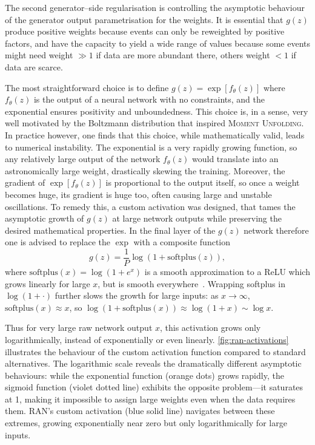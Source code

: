 {{            The second generator--side regularisation is controlling the asymptotic behaviour of the generator output parametrisation for the weights.
            It is essential that $g(z)$ produce positive weights because events can only be reweighted by positive factors, and have the capacity to yield a wide range of values  because some events might need weight $\gg 1$ if data are more abundant there, others weight $<1$ if data are scarce. 
            
            The most straightforward choice is to define $g(z) = \exp[f_\theta(z)]$ where $f_\theta(z)$ is the output of a neural network with no constraints, and the exponential ensures positivity and unboundedness.
            This choice is, in a sense, very well motivated by the Boltzmann distribution that inspired \textsc{Moment Unfolding}.
            In practice however, one finds that this choice, while mathematically valid, leads to numerical instability.
            The exponential is a very rapidly growing function, so any relatively large output of the network $f_\theta(z)$ would translate into an astronomically large weight, drastically skewing the training.
            Moreover, the gradient of $\exp[f_\theta(z)]$ is proportional to the output itself, so once a weight becomes huge, its gradient is huge too, often causing large and unstable oscillations.
            To remedy this, a custom activation was designed, that tames the asymptotic growth of $g(z)$ at large network outputs while preserving the desired mathematical properties.
            In the final layer of the $g(z)$ network therefore one is advised to replace the $\exp$ with a composite function
            \[
                g(z) = \frac1P\log(1 + \mathrm{softplus}(z)),
            \]
            where $\mathrm{softplus}(x) = \log(1+e^x)$ is a smooth approximation to a ReLU which grows linearly for large $x$, but is smooth everywhere~\cite{dugas_incorporating_2000, glorot_deep_2011}.
            Wrapping softplus in $\log(1+\cdot)$ further slows the growth for large inputs: as $x \to \infty$, $\mathrm{softplus}(x)\approx x$, so $\log(1+\mathrm{softplus}(x)) \approx \log(1+x) \sim \log x$.
            
            Thus for very large raw network output $x$, this activation grows only logarithmically, instead of exponentially or even linearly.
\cref{fig:ran-activations} illustrates the behaviour of the custom activation function compared to standard alternatives. The logarithmic scale reveals the dramatically different asymptotic behaviours: while the exponential function (orange dots) grows rapidly, the sigmoid function (violet dotted line) exhibits the opposite problem---it saturates at 1, making it impossible to assign large weights even when the data requires them. RAN's custom activation (blue solid line) navigates between these extremes, growing exponentially near zero but only logarithmically for large inputs.

}}
